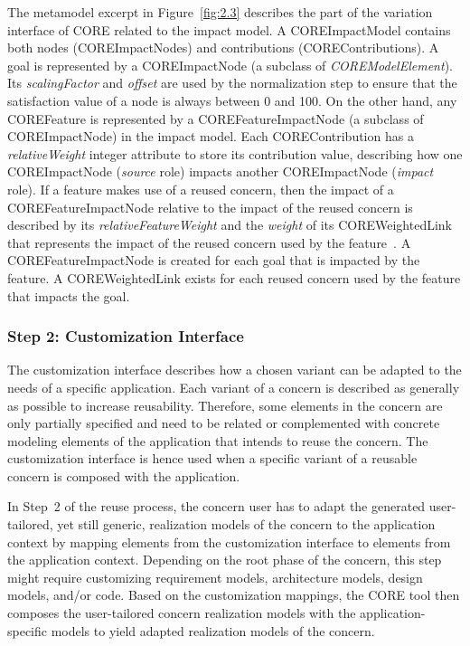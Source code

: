 The metamodel excerpt in Figure~\ref{fig:2.3} describes the part of the variation interface of CORE related to the impact model. A {\cls COREImpactModel} contains both nodes ({\cls COREImpactNode}s) and contributions ({\cls COREContribution}s). A goal is represented by a {\cls COREImpactNode} (a subclass of \textit{\cls COREModelElement}). Its \emph{scalingFactor} and \emph{offset} are used by the normalization step to ensure that the satisfaction value of a node is always between 0 and 100. On the other hand, any {\cls COREFeature} is represented by a {\cls COREFeatureImpactNode} (a subclass of {\cls COREImpactNode}) in the impact model. Each {\cls COREContribution} has a \emph{relativeWeight} integer attribute to store its contribution value, describing how one {\cls COREImpactNode} (\emph{source} role) impacts another {\cls COREImpactNode} (\emph{impact} role). If a feature makes use of a reused concern, then the impact of a {\cls COREFeatureImpactNode} relative to the impact of the reused concern is described by its \emph{relativeFeatureWeight} and the \emph{weight} of its {\cls COREWeightedLink} that represents the impact of the reused concern used by the feature~\cite{duran2015evaluation, alexandre2015support}. A {\cls COREFeatureImpactNode} is created for each goal that is impacted by the feature. A {\cls COREWeightedLink} exists for each reused concern used by the feature that impacts the goal.

\subsubsection{Step 2: Customization Interface}

The customization interface describes how a chosen variant can be adapted to the needs of a specific application. Each variant of a concern is described as generally as possible to increase reusability. Therefore, some elements in the concern are only partially specified and need to be related or complemented with concrete modeling elements of the application that intends to reuse the concern. The customization interface is hence used when a specific variant of a reusable concern is composed with the application.

In Step~2 of the reuse process, the concern user has to adapt the generated user-tailored, yet still generic, realization models of the concern to the application context by mapping elements from the customization interface to elements from the application context. Depending on the root phase of the concern, this step might require customizing requirement models, architecture models, design models, and/or code. Based on the customization mappings, the CORE tool then composes the user-tailored concern realization models with the application-specific models to yield adapted realization models of the concern.

